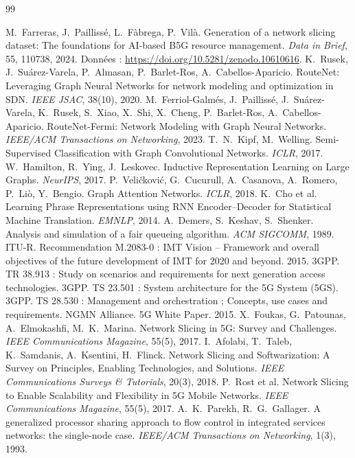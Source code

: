 \documentclass[11pt,a4paper]{report}
\begin{document}
\begin{thebibliography}{99}\small
{} M.~Farreras, J.~Paillissé, L.~Fàbrega, P.~Vilà. Generation of a network slicing dataset: The foundations for AI-based B5G resource management. \emph{Data in Brief}, 55, 110738, 2024. Données : \url{https://doi.org/10.5281/zenodo.10610616}.
 K.~Rusek, J.~Suárez-Varela, P.~Almasan, P.~Barlet-Ros, A.~Cabellos-Aparicio. RouteNet: Leveraging Graph Neural Networks for network modeling and optimization in SDN. \emph{IEEE JSAC}, 38(10), 2020.
 M.~Ferriol-Galmés, J.~Paillissé, J.~Suárez-Varela, K.~Rusek, S.~Xiao, X.~Shi, X.~Cheng, P.~Barlet-Ros, A.~Cabellos-Aparicio. RouteNet-Fermi: Network Modeling with Graph Neural Networks. \emph{IEEE/ACM Transactions on Networking}, 2023.
 T.~N.~Kipf, M.~Welling. Semi-Supervised Classification with Graph Convolutional Networks. \emph{ICLR}, 2017.
 W.~Hamilton, R.~Ying, J.~Leskovec. Inductive Representation Learning on Large Graphs. \emph{NeurIPS}, 2017.
 P.~Veličković, G.~Cucurull, A.~Casanova, A.~Romero, P.~Liò, Y.~Bengio. Graph Attention Networks. \emph{ICLR}, 2018.
 K.~Cho et al. Learning Phrase Representations using RNN Encoder--Decoder for Statistical Machine Translation. \emph{EMNLP}, 2014.
 A.~Demers, S.~Keshav, S.~Shenker. Analysis and simulation of a fair queueing algorithm. \emph{ACM SIGCOMM}, 1989.
 ITU-R. Recommendation M.2083-0 : IMT Vision -- Framework and overall objectives of the future development of IMT for 2020 and beyond. 2015.
 3GPP. TR 38.913 : Study on scenarios and requirements for next generation access technologies.
 3GPP. TS 23.501 : System architecture for the 5G System (5GS).
 3GPP. TS 28.530 : Management and orchestration ; Concepts, use cases and requirements.
 NGMN Alliance. 5G White Paper. 2015.
 X.~Foukas, G.~Patounas, A.~Elmokashfi, M.~K.~Marina. Network Slicing in 5G: Survey and Challenges. \emph{IEEE Communications Magazine}, 55(5), 2017.
 I.~Afolabi, T.~Taleb, K.~Samdanis, A.~Ksentini, H.~Flinck. Network Slicing and Softwarization: A Survey on Principles, Enabling Technologies, and Solutions. \emph{IEEE Communications Surveys \& Tutorials}, 20(3), 2018.
 P.~Rost et al. Network Slicing to Enable Scalability and Flexibility in 5G Mobile Networks. \emph{IEEE Communications Magazine}, 55(5), 2017.
 A.~K.~Parekh, R.~G.~Gallager. A generalized processor sharing approach to flow control in integrated services networks: the single-node case. \emph{IEEE/ACM Transactions on Networking}, 1(3), 1993.

\end{thebibliography}
\end{document}
